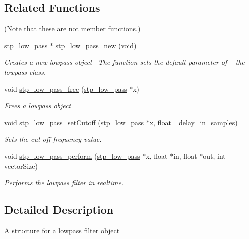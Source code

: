 \subsection*{Related Functions}
(Note that these are not member functions.) \begin{DoxyCompactItemize}
\item 
\hyperlink{structstp__low__pass}{stp\+\_\+low\+\_\+pass} $\ast$ \hyperlink{structstp__low__pass_a445025e9f901399ddb2313b5d667560c}{stp\+\_\+low\+\_\+pass\+\_\+new} (void)
\begin{DoxyCompactList}\small\item\em Creates a new lowpass object~\newline
 The function sets the default parameter of ~\newline
 the lowpass class. \end{DoxyCompactList}\item 
void \hyperlink{structstp__low__pass_a8fde5eb059affdd98ed624f4cb82c06c}{stp\+\_\+low\+\_\+pass\+\_\+free} (\hyperlink{structstp__low__pass}{stp\+\_\+low\+\_\+pass} $\ast$x)
\begin{DoxyCompactList}\small\item\em Frees a lowpass object~\newline
 \end{DoxyCompactList}\item 
void \hyperlink{structstp__low__pass_af42754821e34447af440d8285414aa0a}{stp\+\_\+low\+\_\+pass\+\_\+set\+Cutoff} (\hyperlink{structstp__low__pass}{stp\+\_\+low\+\_\+pass} $\ast$x, float \+\_\+delay\+\_\+in\+\_\+samples)
\begin{DoxyCompactList}\small\item\em Sets the cut off frequency value. ~\newline
 \end{DoxyCompactList}\item 
void \hyperlink{structstp__low__pass_a2211d5b417a91ac4cc2b87f3d9b0f346}{stp\+\_\+low\+\_\+pass\+\_\+perform} (\hyperlink{structstp__low__pass}{stp\+\_\+low\+\_\+pass} $\ast$x, float $\ast$in, float $\ast$out, int vector\+Size)
\begin{DoxyCompactList}\small\item\em Performs the lowpass filter in realtime. ~\newline
 \end{DoxyCompactList}\end{DoxyCompactItemize}


\subsection{Detailed Description}
A structure for a lowpass filter object ~\newline
 

